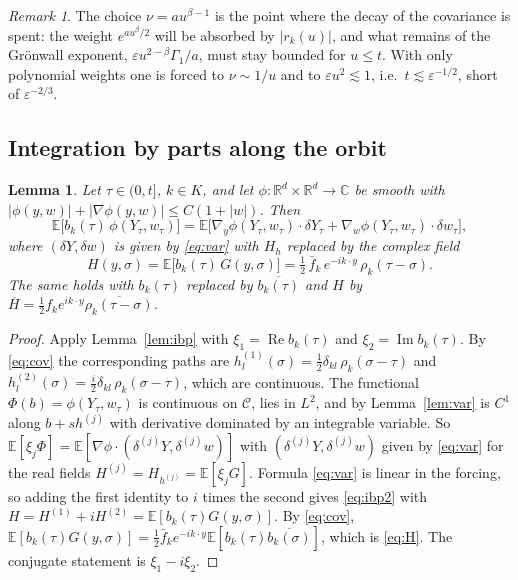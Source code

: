 \documentclass[11pt]{article}
\newcommand{\E}{\mathbb{E}}
\newcommand{\eps}{\varepsilon}
\renewcommand{\Re}{\operatorname{Re}}
\renewcommand{\Im}{\operatorname{Im}}
\newtheorem{lemma}[theorem]{Lemma}
\theoremstyle{remark}
\newtheorem{remark}[theorem]{Remark}
\begin{document}
\begin{remark}
The choice $\nu = au^{\beta-1}$ is the point where the decay of the
covariance is spent: the weight $e^{au^\beta/2}$ will be absorbed by
$|r_k(u)|$, and what remains of the Gr\"onwall exponent,
$\eps u^{2-\beta}\Gamma_1/a$, must stay bounded for $u\le t$. With only
polynomial weights one is forced to $\nu\sim1/u$ and to $\eps u^2\lesssim1$,
i.e.\ $t\lesssim\eps^{-1/2}$, short of $\eps^{-2/3}$.
\end{remark}

\subsection{Integration by parts along the orbit}

\begin{lemma}\label{lem:ibp2}
Let $\tau\in(0,t]$, $k\in K$, and let $\phi:\mathbb{R}^d\times\mathbb{R}^d\to\mathbb{C}$
be smooth with $|\phi(y,w)| + |\nabla\phi(y,w)|\le C(1+|w|)$. Then
\begin{equation}
  \E\bigl[b_k(\tau)\,\phi(Y_\tau,w_\tau)\bigr]
  = \E\bigl[\nabla_y\phi(Y_\tau,w_\tau)\cdot\delta Y_\tau
          + \nabla_w\phi(Y_\tau,w_\tau)\cdot\delta w_\tau\bigr],
  \label{eq:ibp2}
\end{equation}
where $(\delta Y,\delta w)$ is given by \eqref{eq:var} with $H_h$ replaced
by the complex field
\begin{equation}
  H(y,\sigma) = \E\bigl[b_k(\tau)\,G(y,\sigma)\bigr]
  = \tfrac12\,\bar f_k\,e^{-ik\cdot y}\,\rho_k(\tau-\sigma).
  \label{eq:H}
\end{equation}
The same holds with $b_k(\tau)$ replaced by $\overline{b_k(\tau)}$ and $H$
by $\overline H = \frac12f_ke^{ik\cdot y}\overline{\rho_k(\tau-\sigma)}$.
\end{lemma}

\begin{proof}
Apply Lemma~\ref{lem:ibp} with $\xi_1 = \Re b_k(\tau)$ and
$\xi_2 = \Im b_k(\tau)$. By \eqref{eq:cov} the corresponding paths are
$h^{(1)}_l(\sigma) = \frac12\delta_{kl}\,\rho_k(\sigma-\tau)$ and
$h^{(2)}_l(\sigma) = \frac i2\delta_{kl}\,\rho_k(\sigma-\tau)$, which are
continuous. The functional $\Phi(b) = \phi(Y_\tau,w_\tau)$ is continuous on
$\mathcal{C}$, lies in $L^2$, and by Lemma~\ref{lem:var} is $C^1$ along
$b+sh^{(j)}$ with derivative dominated by an integrable variable. So
$\E[\xi_j\Phi] = \E[\nabla\phi\cdot(\delta^{(j)}Y,\delta^{(j)}w)]$ with
$(\delta^{(j)}Y,\delta^{(j)}w)$ given by \eqref{eq:var} for the real fields
$H^{(j)} = H_{h^{(j)}} = \E[\xi_jG]$. Formula \eqref{eq:var} is linear in the
forcing, so adding the first identity to $i$ times the second gives
\eqref{eq:ibp2} with $H = H^{(1)}+iH^{(2)} = \E[b_k(\tau)G(y,\sigma)]$. By
\eqref{eq:cov},
$\E[b_k(\tau)G(y,\sigma)] = \frac12\bar f_ke^{-ik\cdot y}\E[b_k(\tau)\overline{b_k(\sigma)}]$,
which is \eqref{eq:H}. The conjugate statement is $\xi_1-i\xi_2$.
\end{proof}
\end{document}
